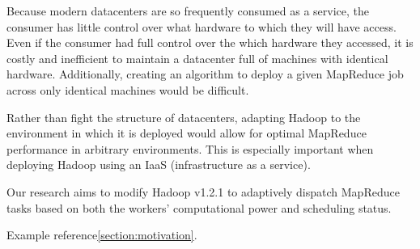 \documentclass{sig-alternate}
\begin{document}
Because modern datacenters are so frequently consumed as a service, the consumer
has little control over what hardware to which they will have access. Even if the
consumer had full control over the which hardware they accessed, it is costly and
inefficient to maintain a datacenter full of machines with identical hardware. 
Additionally, creating an algorithm to deploy a given MapReduce job across only 
identical machines would be difficult.

Rather than fight the structure of datacenters, adapting Hadoop to the environment
in which it is deployed would allow for optimal MapReduce performance in arbitrary
environments. This is especially important when deploying Hadoop using an IaaS 
(infrastructure as a service).

Our research aims to modify Hadoop v1.2.1 to adaptively dispatch MapReduce tasks
based on both the workers’ computational power and scheduling status.

Example reference\ref{section:motivation}.







{}

\end{document}
